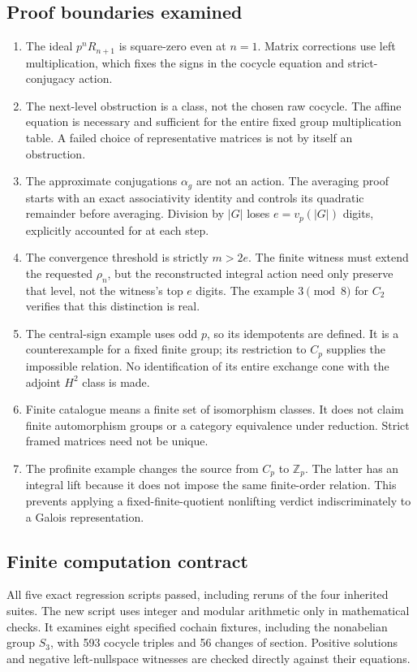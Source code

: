 \subsection{Proof boundaries examined}
\begin{enumerate}
\item The ideal $p^nR_{n+1}$ is square-zero even at $n=1$. Matrix corrections use left multiplication, which fixes the signs in the cocycle equation and strict-conjugacy action.
\item The next-level obstruction is a class, not the chosen raw cocycle. The affine equation is necessary and sufficient for the entire fixed group multiplication table. A failed choice of representative matrices is not by itself an obstruction.
\item The approximate conjugations $\alpha_g$ are not an action. The averaging proof starts with an exact associativity identity and controls its quadratic remainder before averaging. Division by $|G|$ loses $e=v_p(|G|)$ digits, explicitly accounted for at each step.
\item The convergence threshold is strictly $m>2e$. The finite witness must extend the requested $\rho_n$, but the reconstructed integral action need only preserve that level, not the witness's top $e$ digits. The example $3\pmod8$ for $C_2$ verifies that this distinction is real.
\item The central-sign example uses odd $p$, so its idempotents are defined. It is a counterexample for a fixed finite group; its restriction to $C_p$ supplies the impossible relation. No identification of its entire exchange cone with the adjoint $H^2$ class is made.
\item Finite catalogue means a finite set of isomorphism classes. It does not claim finite automorphism groups or a category equivalence under reduction. Strict framed matrices need not be unique.
\item The profinite example changes the source from $C_p$ to $\mathbb Z_p$. The latter has an integral lift because it does not impose the same finite-order relation. This prevents applying a fixed-finite-quotient nonlifting verdict indiscriminately to a Galois representation.
\end{enumerate}

\subsection{Finite computation contract}
All five exact regression scripts passed, including reruns of the four inherited suites. The new script uses integer and modular arithmetic only in mathematical checks. It examines eight specified cochain fixtures, including the nonabelian group $S_3$, with 593 cocycle triples and 56 changes of section. Positive solutions and negative left-nullspace witnesses are checked directly against their equations.


